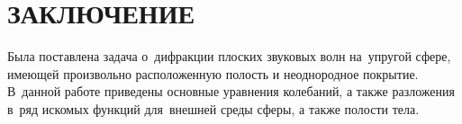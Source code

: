 \newpage
\section*{ЗАКЛЮЧЕНИЕ}
Была поставлена задача о~дифракции плоских звуковых волн на~упругой сфере, имеющей произвольно расположенную полость и неоднородное покрытие. В~данной работе приведены основные уравнения колебаний, а также разложения в~ряд искомых функций для~внешней среды сферы, а также полости тела.

